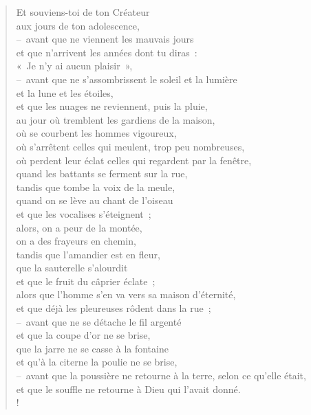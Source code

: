 \documentclass[french,twoside]{book} %
\def\mednobreak{\ifdim\lastskip<\medskipamount
  \removelastskip\nopagebreak\medskip\fi}
\newcommand{\labelblock}[1]{\medbreak{\noindent\color{rubric}\bfseries #1}\par\mednobreak}
\begin{document}
\begin{verse}
Et souviens-toi de ton Créateur \\
aux jours de ton adolescence, \\
– avant que ne viennent les mauvais jours \\
et que n’arrivent les années dont tu diras : \\
« Je n’y ai aucun plaisir »,\\
– avant que ne s’assombrissent le soleil et la lumière \\
et la lune et les étoiles, \\
et que les nuages ne reviennent, puis la pluie,\\
au jour où tremblent les gardiens de la maison, \\
où se courbent les hommes vigoureux, \\
où s’arrêtent celles qui meulent, trop peu nombreuses, \\
où perdent leur éclat celles qui regardent par la fenêtre,\\
quand les battants se ferment sur la rue, \\
tandis que tombe la voix de la meule, \\
quand on se lève au chant de l’oiseau \\
et que les vocalises s’éteignent ;\\
alors, on a peur de la montée, \\
on a des frayeurs en chemin, \\
tandis que l’amandier est en fleur, \\
que la sauterelle s’alourdit \\
et que le fruit du câprier éclate ; \\
alors que l’homme s’en va vers sa maison d’éternité, \\
et que déjà les pleureuses rôdent dans la rue ;\\
– avant que ne se détache le fil argenté \\
et que la coupe d’or ne se brise, \\
que la jarre ne se casse à la fontaine \\
et qu’à la citerne la poulie ne se brise,\\
– avant que la poussière ne retourne à la terre, selon ce qu’elle était, \\
et que le souffle ne retourne à Dieu qui l’avait donné.\\!
\end{verse}

\labelblock{Appendice}
\end{document}
